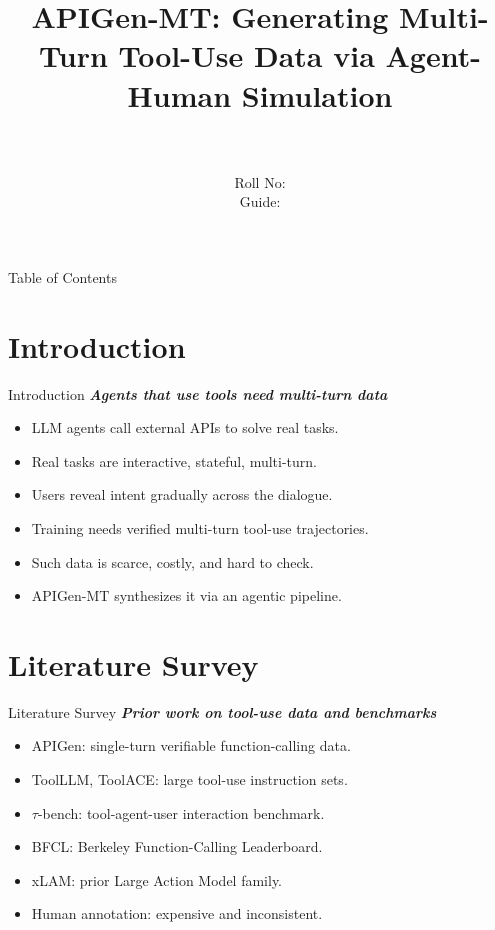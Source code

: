 \documentclass{beamer}
\title[\seminarShortTitle]{APIGen-MT: Generating Multi-Turn Tool-Use Data via Agent-Human Simulation}
\author[\seminarName\ (\seminarShortCollege)]{\seminarName \\ \seminarRoll \\ Roll No: \seminarClassRoll \\ Guide: \seminarGuide}
\institute[\seminarShortCollege]{\seminarDept \\ \seminarCollege}
\date{\seminarDate}
\begin{document}
\begin{frame}\titlepage\end{frame}
\begin{frame}{Table of Contents}\tableofcontents\end{frame}
\section{Introduction}
\begin{frame}{Introduction}
\textbf{\textit{Agents that use tools need multi-turn data}}
\begin{itemize}
\item LLM agents call external APIs to solve real tasks.
\item Real tasks are interactive, stateful, multi-turn.
\item Users reveal intent gradually across the dialogue.
\item Training needs verified multi-turn tool-use trajectories.
\item Such data is scarce, costly, and hard to check.
\item APIGen-MT synthesizes it via an agentic pipeline.
\end{itemize}
\end{frame}

\section{Literature Survey}
\begin{frame}{Literature Survey}
\textbf{\textit{Prior work on tool-use data and benchmarks}}
\begin{itemize}
\item APIGen: single-turn verifiable function-calling data.
\item ToolLLM, ToolACE: large tool-use instruction sets.
\item $\tau$-bench: tool-agent-user interaction benchmark.
\item BFCL: Berkeley Function-Calling Leaderboard.
\item xLAM: prior Large Action Model family.
\item Human annotation: expensive and inconsistent.
\end{itemize}
\end{frame}
\end{document}
